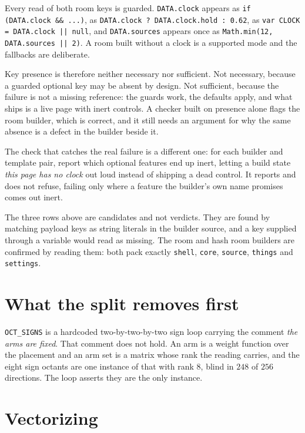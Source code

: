 Every read of both room keys is guarded. \texttt{DATA.clock} appears as \texttt{if (DATA.clock \&\& ...)}, as \texttt{DATA.clock ? DATA.clock.hold : 0.62}, as \texttt{var CLOCK = DATA.clock || null}, and \texttt{DATA.sources} appears once as \texttt{Math.min(12, DATA.sources || 2)}. A room built without a clock is a supported mode and the fallbacks are deliberate.

Key presence is therefore neither necessary nor sufficient. Not necessary, because a guarded optional key may be absent by design. Not sufficient, because the failure is not a missing reference: the guards work, the defaults apply, and what ships is a live page with inert controls. A checker built on presence alone flags the room builder, which is correct, and it still needs an argument for why the same absence is a defect in the builder beside it.

The check that catches the real failure is a different one: for each builder and template pair, report which optional features end up inert, letting a build state \emph{this page has no clock} out loud instead of shipping a dead control. It reports and does not refuse, failing only where a feature the builder's own name promises comes out inert.

The three rows above are candidates and not verdicts. They are found by matching payload keys as string literals in the builder source, and a key supplied through a variable would read as missing. The room and hash room builders are confirmed by reading them: both pack exactly \texttt{shell}, \texttt{core}, \texttt{source}, \texttt{things} and \texttt{settings}.

\section{What the split removes first}

\texttt{OCT\_SIGNS} is a hardcoded two-by-two-by-two sign loop carrying the comment \emph{the arms are fixed}. That comment does not hold. An arm is a weight function over the placement and an arm set is a matrix whose rank the reading carries, and the eight sign octants are one instance of that with rank \(8\), blind in \(248\) of \(256\) directions. The loop asserts they are the only instance.

\section{Vectorizing}

